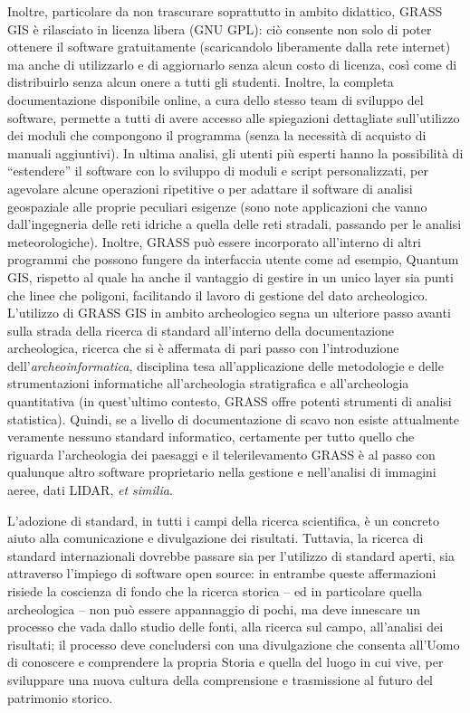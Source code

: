 	Inoltre, particolare da non trascurare soprattutto in ambito didattico, GRASS GIS è rilasciato in licenza libera (GNU GPL): ciò consente non solo di poter ottenere il software gratuitamente (scaricandolo liberamente dalla rete internet) ma anche di utilizzarlo e di aggiornarlo senza alcun costo di licenza, così come di distribuirlo senza alcun onere a tutti gli studenti. Inoltre, la completa documentazione disponibile online, a cura dello stesso team di sviluppo del software, permette a tutti di avere accesso alle spiegazioni dettagliate sull'utilizzo dei moduli che compongono il programma (senza la necessità di acquisto di manuali aggiuntivi). In ultima analisi, gli utenti più esperti hanno la possibilità di ``estendere'' il software con lo sviluppo di moduli e script personalizzati, per agevolare alcune operazioni ripetitive o per adattare il software di analisi geospaziale alle proprie peculiari esigenze (sono note applicazioni che vanno dall'ingegneria delle reti idriche a quella delle reti stradali, passando per le analisi meteorologiche). Inoltre, GRASS può essere incorporato all'interno di altri programmi che possono fungere da interfaccia utente come ad esempio, Quantum GIS, rispetto al quale ha anche il vantaggio di gestire in un unico layer sia punti che linee che poligoni, facilitando il lavoro di gestione del dato archeologico.\\

	L'utilizzo di GRASS GIS in ambito archeologico segna un ulteriore passo avanti sulla strada della ricerca di standard all'interno della documentazione archeologica, ricerca che si è affermata di pari passo con l'introduzione dell'\emph{archeoinformatica}, disciplina tesa all'applicazione delle metodologie e delle strumentazioni informatiche all'archeologia stratigrafica e all'archeologia quantitativa (in quest'ultimo contesto, GRASS offre potenti strumenti di analisi statistica). Quindi, se a livello di documentazione di scavo non esiste attualmente veramente nessuno standard informatico, certamente per tutto quello che riguarda l'archeologia dei paesaggi e il telerilevamento GRASS è al passo con qualunque altro software proprietario nella gestione e nell'analisi di immagini aeree, dati LIDAR, \emph{et similia}.

	L'adozione di standard, in tutti i campi della ricerca scientifica, è un concreto aiuto alla comunicazione e divulgazione dei risultati.  Tuttavia, la ricerca di standard internazionali dovrebbe passare sia per l'utilizzo di standard aperti, sia attraverso l'impiego di software open source: in entrambe queste affermazioni risiede la coscienza di fondo che la ricerca storica -- ed in particolare quella archeologica -- non può essere appannaggio di pochi, ma deve innescare un processo che vada dallo studio delle fonti, alla ricerca sul campo, all'analisi dei risultati; il processo deve concludersi con una divulgazione che consenta all'Uomo di conoscere e comprendere la propria Storia e quella del luogo in cui vive, per sviluppare una nuova cultura della comprensione e trasmissione al futuro del patrimonio storico.\\

